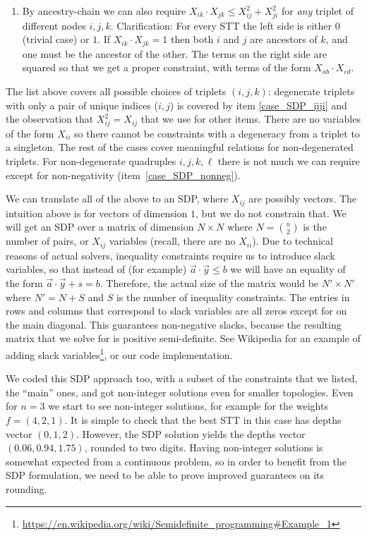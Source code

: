 \begin{enumerate}
    \item By ancestry-chain we can also require $X_{ik} \cdot X_{jk} \le X_{ij}^2 + X_{ji}^2$ for \emph{any} triplet of different nodes $i,j,k$. Clarification: For every STT the left side is either $0$ (trivial case) or $1$. If $X_{ik} \cdot X_{jk} = 1$ then both $i$ and $j$ are ancestors of $k$, and one must be the ancestor of the other. The terms on the right side are squared so that we get a proper constraint, with terms of the form $X_{ab} \cdot X_{cd}$.
    
\end{enumerate}

The list above covers all possible choices of triplets $(i,j,k)$: degenerate triplets with only a pair of unique indices ($i,j$) is covered by item \ref{case_SDP_ijji} and the observation that $X_{ij}^2 = X_{ij}$ that we use for other items. There are no variables of the form $X_{ii}$ so there cannot be constraints with a degeneracy from a triplet to a singleton. The rest of the cases cover meaningful relations for non-degenerated triplets. For non-degenerate quadruples $i,j,k,\ell$ there is not much we can require except for non-negativity (item~\ref{case_SDP_nonneg}).

We can translate all of the above to an SDP, where $X_{ij}$ are possibly vectors. The intuition above is for vectors of dimension $1$, but we do not constrain that. We will get an SDP over a matrix of dimension $N \times N$ where $N = \binom{n}{2}$ is the number of pairs, or $X_{ij}$ variables (recall, there are no $X_{ii}$). Due to technical reasons of actual solvers, inequality constraints require us to introduce slack variables, so that instead of (for example) $\vec{a} \cdot \vec{y} \le b$ we will have an equality of the form $\vec{a} \cdot \vec{y} + s = b$. Therefore, the actual size of the matrix would be $N' \times N'$ where $N' = N + S$ and $S$ is the number of inequality constraints. The entries in rows and columns that correspond to slack variables are all zeros except for on the main diagonal. This guarantees non-negative slacks, because the resulting matrix that we solve for is positive semi-definite. See Wikipedia for an example of adding slack variables\footnote{\url{https://en.wikipedia.org/wiki/Semidefinite_programming\#Example_1}}, or our code implementation.

We coded this SDP approach too, with a subset of the constraints that we listed, the ``main'' ones, and got non-integer solutions even for smaller topologies. Even for $n=3$ we start to see non-integer solutions, for example for the weights $f=(4,2,1)$. It is simple to check that the best STT in this case has depths vector $(0,1,2)$. However, the SDP solution yields the depths vector $(0.06,0.94,1.75)$, rounded to two digits. Having non-integer solutions is somewhat expected from a continuous problem, so in order to benefit from the SDP formulation, we need to be able to prove improved guarantees on its rounding.


